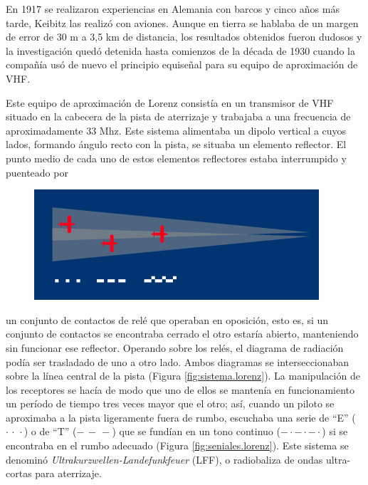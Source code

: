 En 1917 se realizaron experiencias en Alemania con barcos y cinco a\~nos m\'as tarde, Keibitz las realiz\'o con aviones. Aunque en tierra se hablaba de un margen de error de 30 m a 3,5 km de distancia, los resultados obtenidos fueron dudosos y la investigaci\'on qued\'o detenida hasta comienzos de la d\'ecada de 1930 cuando la compa\~n\'ia us\'o de nuevo el principio equise\~nal para su equipo de aproximaci\'on de VHF.

Este equipo de aproximaci\'on de Lorenz consist\'ia en un transmisor de VHF situado en la cabecera de la pista de aterrizaje y trabajaba a una frecuencia de aproximadamente 33 Mhz. Este sistema alimentaba un dipolo vertical a cuyos lados, formando \'angulo recto con la pista, se situaba un elemento reflector. El punto medio de cada uno de estos elementos reflectores estaba interrumpido y puenteado por
\begin{figure} \centering
  \includegraphics[width=\linewidth]{Imagenes/06.02.vor.imagenes/Lorenz_beam.png}
\end{figure}
un conjunto de contactos de rel\'e que operaban en oposici\'on, esto es, si un conjunto de contactos se encontraba cerrado el otro estar\'ia abierto, manteniendo sin funcionar ese reflector. Operando sobre los rel\'es, el diagrama de radiaci\'on pod\'ia ser trasladado de uno a otro lado. Ambos diagramas se interseccionaban sobre la l\'inea central de la pista  (Figura \ref{fig:sistema.lorenz}). La manipulaci\'on de los receptores se hac\'ia de modo que uno de ellos se manten\'ia en funcionamiento un per\'iodo de tiempo tres veces mayor que el otro; as\'i, cuando un piloto se aproximaba a la pista ligeramente fuera de rumbo, escuchaba una serie de ``E'' ($\cdot \, \cdot \, \cdot$) o de ``T'' ($- \, - \, -$) que se fund\'ian en un tono continuo ($- \cdot - \cdot - \cdot$) si se encontraba en el rumbo adecuado (Figura \ref{fig:seniales.lorenz}). Este sistema se denomin\'o \emph{Ultrakurzwellen-Landefunkfeuer} (LFF), o radiobaliza de ondas ultra-cortas para aterrizaje.


